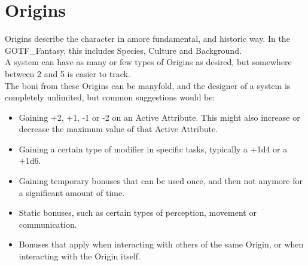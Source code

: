 \section{Origins}\label{sec:origins}
Origins describe the character in amore fundamental, and historic way.
In the GOTF\_Fantasy, this includes Species, Culture and Background.\\
A system can have as many or few types of Origins as desired, but somewhere between 2 and 5 is easier to track.\\
The boni from these Origins can be manyfold, and the designer of a system is completely unlimited, but common suggestions would be:
\begin{itemize}
    \item Gaining +2, +1, -1 or -2 on an Active Attribute.
    This might also increase or decrease the maximum value of that Active Attribute.
    \item Gaining a certain type of modifier in specific tasks, typically a +1d4 or a +1d6.
    \item Gaining temporary bonuses that can be used once, and then not anymore for a significant amount of time.
    \item Static bonuses, such as certain types of perception, movement or communication.
    \item Bonuses that apply when interacting with others of the same Origin, or when interacting with the Origin itself.
\end{itemize}

